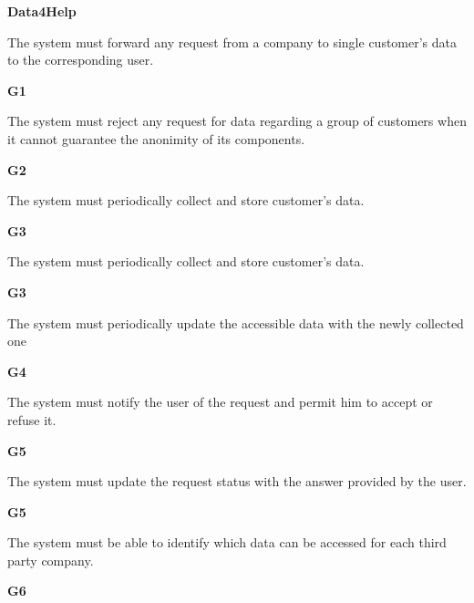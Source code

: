 \documentclass[../main.tex]{subfiles}
\begin{document}
\begin{minipage}{\textwidth}
\vspace{4mm}
{\bf Data4Help}

\vspace{0.5cm}

\begin{description}
	\item [R1] The system must forward any request from a company to single customer's data to the corresponding user.
	\item \begin{flushright}{\bf{G1}}\end{flushright}

	\item [R2] The system must reject any request for data regarding a group of customers when it cannot guarantee the anonimity of its components.
	\item \begin{flushright}{\bf{G2}}\end{flushright}

	\item [R3] The system must periodically collect and store customer's data.
	\item \begin{flushright}{\bf{G3}}\end{flushright}

	\item [R3] The system must periodically collect and store customer's data.
	\item \begin{flushright}{\bf{G3}}\end{flushright}

	\item [R4] The system must periodically update the accessible data with the newly collected one
	\item \begin{flushright}{\bf{G4}}\end{flushright}

	\item [R5] The system must notify the user of the request and permit him to accept or refuse it.
	\item \begin{flushright}{\bf{G5}}\end{flushright}

	\item [R6] The system must update the request status with the answer provided by the user.
	\item \begin{flushright}{\bf{G5}}\end{flushright}

	\item [R7] The system must be able to identify which data can be accessed for each third party company.
	\item \begin{flushright}{\bf{G6}}\end{flushright}

\end{description}
\end{minipage}
\vspace{8mm}
\end{document}
